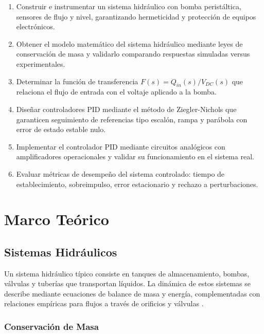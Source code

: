\documentclass[conference]{IEEEtran}
\begin{document}
\begin{enumerate}
\item Construir e instrumentar un sistema hidráulico con bomba peristáltica, sensores de flujo y nivel, garantizando hermeticidad y protección de equipos electrónicos.

\item Obtener el modelo matemático del sistema hidráulico mediante leyes de conservación de masa y validarlo comparando respuestas simuladas versus experimentales.

\item Determinar la función de transferencia $F(s) = Q_{in}(s)/V_{DC}(s)$ que relaciona el flujo de entrada con el voltaje aplicado a la bomba.

\item Diseñar controladores PID mediante el método de Ziegler-Nichols que garanticen seguimiento de referencias tipo escalón, rampa y parábola con error de estado estable nulo.

\item Implementar el controlador PID mediante circuitos analógicos con amplificadores operacionales y validar su funcionamiento en el sistema real.

\item Evaluar métricas de desempeño del sistema controlado: tiempo de establecimiento, sobreimpulso, error estacionario y rechazo a perturbaciones.
\end{enumerate}

\section{Marco Teórico}

\subsection{Sistemas Hidráulicos}

Un sistema hidráulico típico consiste en tanques de almacenamiento, bombas, válvulas y tuberías que transportan líquidos. La dinámica de estos sistemas se describe mediante ecuaciones de balance de masa y energía, complementadas con relaciones empíricas para flujos a través de orificios y válvulas \cite{coughanowr}.

\subsubsection{Conservación de Masa}
\end{document}
